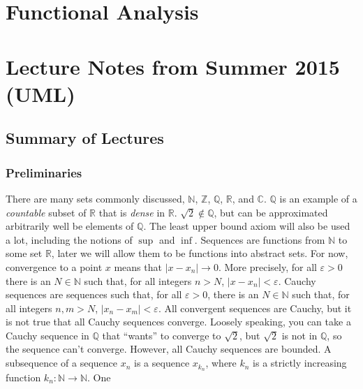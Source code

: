 \documentclass[crop=false,class=article,oneside]{standalone}
\begin{document}
    \ifx\ifmathcoursesfunctional\undefined
        \section*{Functional Analysis}
        \setcounter{section}{1}
    \else
        \section{Lecture Notes from Summer 2015 (UML)}
    \fi
    \subsection{Summary of Lectures}
        \subsubsection{Preliminaries}
            There are many sets commonly discussed,
            $\mathbb{N}$, $\mathbb{Z}$, $\mathbb{Q}$,
            $\mathbb{R}$, and $\mathbb{C}$.
            $\mathbb{Q}$ is an example of a
            \textit{countable} subset of $\mathbb{R}$ that is
            \textit{dense} in $\mathbb{R}$.
            $\sqrt{2}\notin\mathbb{Q}$, but can be approximated
            arbitrarily well be elements of $\mathbb{Q}$.
            The least upper bound axiom will also be used a lot,
            including the notions of $\sup$ and $\inf$. Sequences
            are functions from $\mathbb{N}$ to some set
            $\mathbb{R}$, later we will allow them to be functions
            into abstract sets. For now, convergence to a point $x$
            means that $|x-x_{n}|\rightarrow{0}$. More precisely,
            for all $\varepsilon>0$ there is an $N\in\mathbb{N}$
            such that, for all integers $n>N$,
            $|x-x_{n}|<\varepsilon$. Cauchy sequences are
            sequences such that, for all $\varepsilon>0$, there
            is an $N\in\mathbb{N}$ such that, for all integers
            $n,m>N$, $|x_{n}-x_{m}|<\varepsilon$. All convergent
            sequences are Cauchy, but it is not true that all
            Cauchy sequences converge. Loosely speaking, you can
            take a Cauchy sequence in $\mathbb{Q}$ that ``wants''
            to converge to $\sqrt{2}$, but $\sqrt{2}$ is not
            in $\mathbb{Q}$, so the sequence can't converge.
            However, all Cauchy sequences are bounded. A
            subsequence of a sequence $x_{n}$ is a sequence
            $x_{k_{n}}$, where $k_{n}$ is a strictly increasing
            function $k_{n}:\mathbb{N}\rightarrow\mathbb{N}$. One
\end{document}
